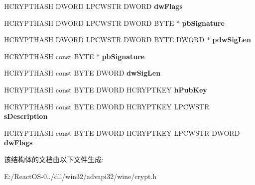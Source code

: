\begin{DoxyCompactItemize}
H\+C\+R\+Y\+P\+T\+H\+A\+SH D\+W\+O\+RD L\+P\+C\+W\+S\+TR D\+W\+O\+RD {\bfseries dw\+Flags}
\item 
\mbox{\label{structtag_p_r_o_v_f_u_n_c_s_a1712045ae766510d595b331276d79bc0}} 
H\+C\+R\+Y\+P\+T\+H\+A\+SH D\+W\+O\+RD L\+P\+C\+W\+S\+TR D\+W\+O\+RD B\+Y\+TE $\ast$ {\bfseries pb\+Signature}
\item 
\mbox{\label{structtag_p_r_o_v_f_u_n_c_s_a4c4f94b4cd9e9eb0db5d65f6f3df8e37}} 
H\+C\+R\+Y\+P\+T\+H\+A\+SH D\+W\+O\+RD L\+P\+C\+W\+S\+TR D\+W\+O\+RD B\+Y\+TE D\+W\+O\+RD $\ast$ {\bfseries pdw\+Sig\+Len}
\item 
\mbox{\label{structtag_p_r_o_v_f_u_n_c_s_ac0c597b90dcd70c6b5865fd15aaf2143}} 
H\+C\+R\+Y\+P\+T\+H\+A\+SH const B\+Y\+TE $\ast$ {\bfseries pb\+Signature}
\item 
\mbox{\label{structtag_p_r_o_v_f_u_n_c_s_a84ae121ce2d792dd63e483d6ea52e003}} 
H\+C\+R\+Y\+P\+T\+H\+A\+SH const B\+Y\+TE D\+W\+O\+RD {\bfseries dw\+Sig\+Len}
\item 
\mbox{\label{structtag_p_r_o_v_f_u_n_c_s_ada3c4baa6f6e9e26acaa640253947cb2}} 
H\+C\+R\+Y\+P\+T\+H\+A\+SH const B\+Y\+TE D\+W\+O\+RD H\+C\+R\+Y\+P\+T\+K\+EY {\bfseries h\+Pub\+Key}
\item 
\mbox{\label{structtag_p_r_o_v_f_u_n_c_s_a2820f9cf3ec29f80dc4ac9259d09552b}} 
H\+C\+R\+Y\+P\+T\+H\+A\+SH const B\+Y\+TE D\+W\+O\+RD H\+C\+R\+Y\+P\+T\+K\+EY L\+P\+C\+W\+S\+TR {\bfseries s\+Description}
\item 
\mbox{\label{structtag_p_r_o_v_f_u_n_c_s_a9eb527d517c5a66dd5404f5ad56af901}} 
H\+C\+R\+Y\+P\+T\+H\+A\+SH const B\+Y\+TE D\+W\+O\+RD H\+C\+R\+Y\+P\+T\+K\+EY L\+P\+C\+W\+S\+TR D\+W\+O\+RD {\bfseries dw\+Flags}
\end{DoxyCompactItemize}


该结构体的文档由以下文件生成\+:\begin{DoxyCompactItemize}
\item 
E\+:/\+React\+O\+S-\/0../dll/win32/advapi32/wine/crypt.\+h\end{DoxyCompactItemize}
